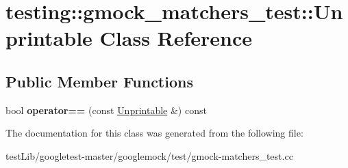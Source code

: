 \hypertarget{classtesting_1_1gmock__matchers__test_1_1Unprintable}{}\section{testing\+:\+:gmock\+\_\+matchers\+\_\+test\+:\+:Unprintable Class Reference}
\label{classtesting_1_1gmock__matchers__test_1_1Unprintable}
\subsection*{Public Member Functions}
\begin{DoxyCompactItemize}
\item 
\mbox{\label{classtesting_1_1gmock__matchers__test_1_1Unprintable_ae09dc235a5341b07f0299bd24ee37e2d}} 
bool {\bfseries operator==} (const \hyperlink{classtesting_1_1gmock__matchers__test_1_1Unprintable}{Unprintable} \&) const
\end{DoxyCompactItemize}


The documentation for this class was generated from the following file\+:\begin{DoxyCompactItemize}
\item 
test\+Lib/googletest-\/master/googlemock/test/gmock-\/matchers\+\_\+test.\+cc\end{DoxyCompactItemize}
